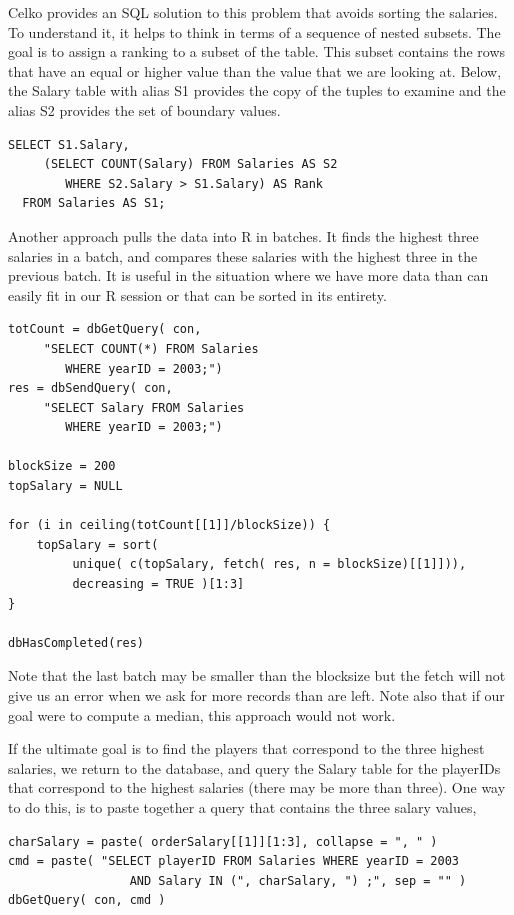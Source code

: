 Celko provides an SQL solution to this problem that avoids sorting 
the salaries.
To understand it, it helps to think in terms of a sequence of nested subsets.
The goal is to assign a ranking to a subset of the table.
This subset contains the rows that have an equal
or higher value than the value that we are looking at.
Below, the Salary table with alias S1 provides the copy of the tuples 
to examine and the alias S2 provides the set of boundary values.
\begin{verbatim}
SELECT S1.Salary, 
     (SELECT COUNT(Salary) FROM Salaries AS S2
        WHERE S2.Salary > S1.Salary) AS Rank
  FROM Salaries AS S1;
\end{verbatim}

Another approach pulls the data into R in batches.
It finds the highest three salaries in a batch, and compares 
these salaries with the highest three in the previous batch. 
It is useful in the situation where we have more data than 
can easily fit in our R session or that can be sorted
in its entirety.
\begin{verbatim}
totCount = dbGetQuery( con, 
     "SELECT COUNT(*) FROM Salaries 
        WHERE yearID = 2003;")
res = dbSendQuery( con, 
     "SELECT Salary FROM Salaries 
        WHERE yearID = 2003;")

blockSize = 200
topSalary = NULL

for (i in ceiling(totCount[[1]]/blockSize)) {
    topSalary = sort( 
         unique( c(topSalary, fetch( res, n = blockSize)[[1]])),
         decreasing = TRUE )[1:3]
}

dbHasCompleted(res)
\end{verbatim}
Note that the last batch may be smaller than the blocksize
but the fetch will not give us an error when we ask for
more records than are left.
Note also that if our goal were to compute a median, 
this approach would not work.

If the ultimate goal is to find the players 
that correspond to the three highest salaries, we return to the 
database, and query the Salary table for the playerIDs that correspond
to the highest salaries (there may be more than three).
One way to do this, is to paste together a query that contains
the three salary values,
\begin{verbatim}
charSalary = paste( orderSalary[[1]][1:3], collapse = ", " )
cmd = paste( "SELECT playerID FROM Salaries WHERE yearID = 2003 
                 AND Salary IN (", charSalary, ") ;", sep = "" )
dbGetQuery( con, cmd )
\end{verbatim}

